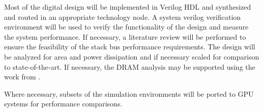 
Most of the digital design will be implemented in Verilog HDL and synthesized and routed in an appropriate technology node.
A system verilog verification environment will be used to verify the functionality of the design and measure the system performance.
If necessary, a literature review will be performed to ensure the feasibility of the stack bus performance requirements.
The design will be analyzed for area and power dissipation and if necessary scaled for comparison to state-of-the-art.
If necessary, the DRAM analysis may be supported using the work from \cite{park2015data}.

Where necessary, subsets of the simulation environments will be ported to GPU systems for performance comparisons.


